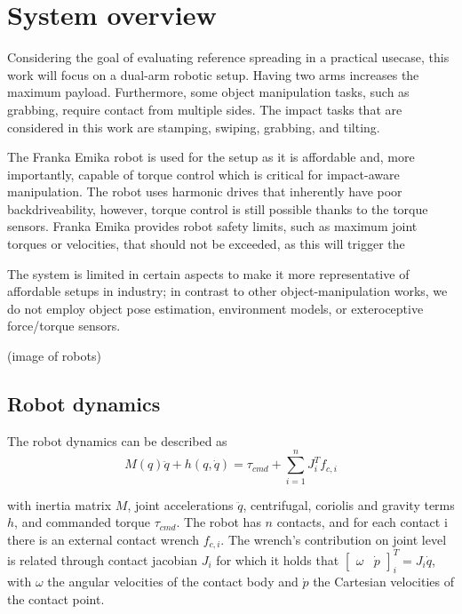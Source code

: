 \documentclass[a4paper, 10pt, conference]{ieeeconf}
\begin{document}
    \section{System overview}
    Considering the goal of evaluating reference spreading in a practical usecase, this work will focus on a dual-arm robotic setup. Having two arms increases the maximum payload. Furthermore, some object manipulation tasks, such as grabbing, require contact from multiple sides. The impact tasks that are considered in this work are stamping, swiping, grabbing, and tilting. 

    The Franka Emika robot \cite{haddadinFrankaEmikaRobot2022} is used for the setup as it is affordable and, more importantly, capable of torque control which is critical for impact-aware manipulation. The robot uses harmonic drives that inherently have poor backdriveability, however, torque control is still possible thanks to the torque sensors. Franka Emika provides robot safety limits, such as maximum joint torques or velocities, that should not be exceeded, as this will trigger the 

    The system is limited in certain aspects to make it more representative of affordable setups in industry; in contrast to other object-manipulation works, we do not employ object pose estimation, environment models, or exteroceptive force/torque sensors. 

    (image of robots)

    \subsection{Robot dynamics}
    The robot dynamics can be described as 
    \begin{equation}
    M(q)\ddot{q}+h(q,\dot{q})= \tau_{cmd} + \sum_{i=1}^n J_i^Tf_{c,i}
    \end{equation}
    
    with inertia matrix $M$, joint accelerations $\ddot{q}$, centrifugal, coriolis and gravity terms $h$, and commanded torque $\tau_{cmd}$. The robot has $n$ contacts, and for each contact i there is an external contact wrench $f_{c,i}$. The wrench's contribution on joint level is related through contact jacobian $J_i$ for which it holds that $\begin{bmatrix} \omega & \dot{p} \end{bmatrix}_i^T=J_i\dot{q}$, with $\omega$ the angular velocities of the contact body and $\dot{p}$ the Cartesian velocities of the contact point. 
\end{document}
